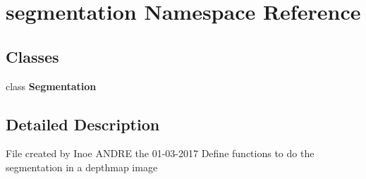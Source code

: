 \section{segmentation Namespace Reference}
\label{namespacesegmentation}
\subsection*{Classes}
\begin{DoxyCompactItemize}
\item 
class \textbf{ Segmentation}
\end{DoxyCompactItemize}


\subsection{Detailed Description}
\begin{DoxyVerb}File created by Inoe ANDRE the 01-03-2017
Define functions to do the segmentation in a depthmap image
\end{DoxyVerb}
 
